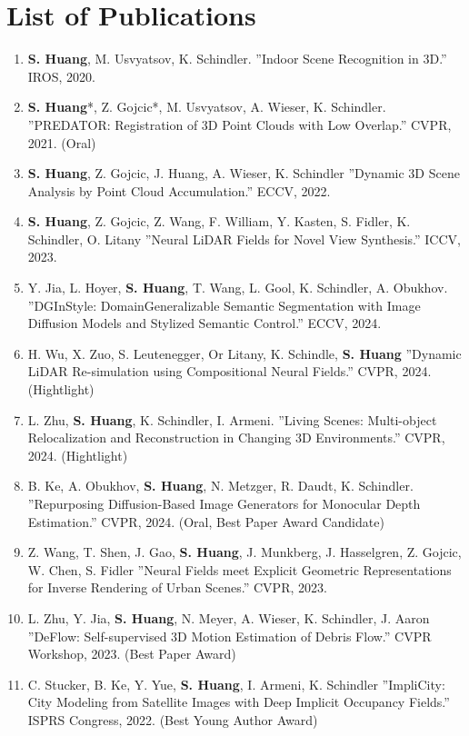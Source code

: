 
\chapter{List of Publications}
\label{chap:pub}

\begin{enumerate}
    \item \textbf{\textbf{S. Huang}}, M. Usvyatsov, K. Schindler. ”Indoor Scene Recognition in 3D.” IROS, 2020.
    \item \textbf{S. Huang}*, Z. Gojcic*, M. Usvyatsov, A. Wieser, K. Schindler. ”PREDATOR: Registration of 3D Point Clouds with Low Overlap.” CVPR, 2021. (Oral)
    \item \textbf{S. Huang}, Z. Gojcic, J. Huang, A. Wieser, K. Schindler ”Dynamic 3D Scene Analysis by Point Cloud Accumulation.” ECCV, 2022.
    \item \textbf{S. Huang}, Z. Gojcic, Z. Wang, F. William, Y. Kasten, S. Fidler, K. Schindler, O. Litany ”Neural LiDAR Fields for Novel View Synthesis.” ICCV, 2023.
    \item Y. Jia, L. Hoyer, \textbf{S. Huang}, T. Wang, L. Gool, K. Schindler, A. Obukhov. ”DGInStyle: DomainGeneralizable Semantic Segmentation with Image Diﬀusion Models and Stylized Semantic Control.” ECCV, 2024.
    \item H. Wu, X. Zuo, S. Leutenegger, Or Litany, K. Schindle, \textbf{S. Huang} ”Dynamic LiDAR Re-simulation using Compositional Neural Fields.” CVPR, 2024. (Hightlight)
    \item L. Zhu, \textbf{S. Huang}, K. Schindler, I. Armeni. ”Living Scenes: Multi-object Relocalization and Reconstruction in Changing 3D Environments.” CVPR, 2024. (Hightlight)
    \item B. Ke, A. Obukhov, \textbf{S. Huang}, N. Metzger, R. Daudt, K. Schindler. ”Repurposing Diﬀusion-Based Image Generators for Monocular Depth Estimation.” CVPR, 2024. (Oral, Best Paper Award Candidate)
    \item Z. Wang, T. Shen, J. Gao, \textbf{S. Huang}, J. Munkberg, J. Hasselgren, Z. Gojcic, W. Chen, S. Fidler ”Neural Fields meet Explicit Geometric Representations for Inverse Rendering of Urban Scenes.” CVPR, 2023.
    \item L. Zhu, Y. Jia, \textbf{S. Huang}, N. Meyer, A. Wieser, K. Schindler, J. Aaron ”DeFlow: Self-supervised 3D Motion Estimation of Debris Flow.” CVPR Workshop, 2023. (Best Paper Award)
    \item C. Stucker, B. Ke, Y. Yue, \textbf{S. Huang}, I. Armeni, K. Schindler ”ImpliCity: City Modeling from Satellite Images with Deep Implicit Occupancy Fields.” ISPRS Congress, 2022. (Best Young Author Award)

\end{enumerate}

